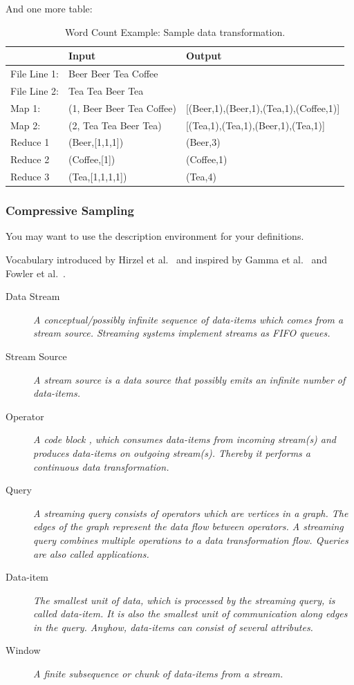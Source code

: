 And one more table:

\begin{table}[h!]
  \centering
  \begin{tabular}{lll}
	\toprule    
    \hline
    & \textbf{Input} & \textbf{Output}\\
    \midrule
    File Line 1:& Beer Beer Tea Coffee &\\
    File Line 2:& Tea Tea Beer Tea &\\
	\hline
	Map 1: & (1, Beer Beer Tea Coffee) & [(Beer,1),(Beer,1),(Tea,1),(Coffee,1)]\\
    Map 2: & (2, Tea Tea Beer Tea)     & [(Tea,1),(Tea,1),(Beer,1),(Tea,1)]\\
    \hline
    Reduce 1 & (Beer,[1,1,1])  & (Beer,3)\\  
	Reduce 2 & (Coffee,[1])    & (Coffee,1)\\
	Reduce 3 & (Tea,[1,1,1,1]) & (Tea,4)\\
    \hline    
    \bottomrule
  \end{tabular}
  \caption{Word Count Example: Sample data transformation.}
  \label{table:wcDataTransformation}
\end{table}

\subsubsection{Compressive Sampling}

You may want to use the description environment for your definitions.

Vocabulary introduced by Hirzel et al.~\cite{hirzel2014catalog} and inspired by Gamma et al.~\cite{gamma1995} and Fowler et al.~\cite{fowler1999}.

\begin{description}
	\item[Data Stream] \textit{A conceptual/possibly infinite sequence of data-items which comes from a stream source. Streaming systems implement streams as \ac{FIFO} queues.}
	\item[Stream Source] \textit{A stream source is a data source that possibly emits an infinite number of data-items.}
	\item[Operator] \textit{A code block , which consumes data-items from incoming stream(s) and produces data-items on outgoing stream(s). Thereby it performs a continuous data transformation.}
	\item[Query] \textit{A streaming query consists of operators which are vertices in a graph. The edges of the graph represent the data flow between operators. A streaming query combines multiple operations to a data transformation flow. Queries are also called \textit{applications}.}
	\item[Data-item] \textit{The smallest unit of data, which is processed by the streaming query, is called \emph{data-item}. It is also the smallest unit of communication along edges in the query. Anyhow, data-items can consist of several attributes.}
	\item[Window] \textit{A finite subsequence or chunk of data-items from a stream.}
\end{description}


